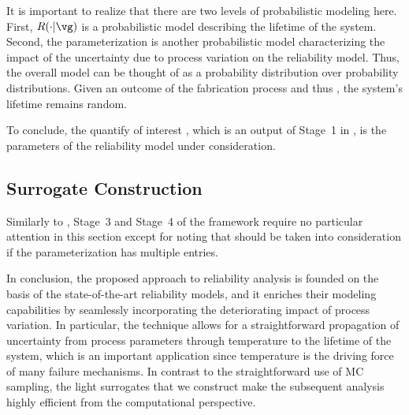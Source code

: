 \begin{remark} 
It is important to realize that there are two levels of probabilistic modeling
here. First, $R(\cdot | \vg)$ \perse is a probabilistic model describing the
lifetime \life of the system. Second, the parameterization \vg is another
probabilistic model characterizing the impact of the uncertainty due to process
variation on the reliability model. Thus, the overall model can be thought of as
a probability distribution over probability distributions. Given an outcome of
the fabrication process and thus \vg, the system's lifetime remains random.
\end{remark}

To conclude, the quantify of interest \g, which is an output of Stage~1 in
, is the parameters \vg of the reliability model under
consideration.

\subsection{Surrogate Construction}

Similarly to , Stage~3 and Stage~4 of the
framework require no particular attention in this section except for noting that
 should be taken into consideration if the
parameterization \vg has multiple entries.

\conclusioncut
In conclusion, the proposed approach to reliability analysis is founded on the
basis of the state-of-the-art reliability models, and it enriches their modeling
capabilities by seamlessly incorporating the deteriorating impact of process
variation. In particular, the technique allows for a straightforward propagation
of uncertainty from process parameters through temperature to the lifetime of
the system, which is an important application since temperature is the driving
force of many failure mechanisms. In contrast to the straightforward use of
\ac{MC} sampling, the light surrogates that we construct make the subsequent
analysis highly efficient from the computational perspective.
